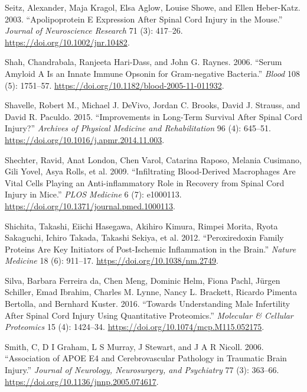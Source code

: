 \documentclass[9pt,lineno]{elife}
\newlength{\cslhangindent}
\newlength{\cslentryspacingunit} %
\newenvironment{CSLReferences}[2] %
 {%
  \setlength{\parindent}{0pt}
  \ifodd #1
  \let\oldpar\par
  \def\par{\hangindent=\cslhangindent\oldpar}
  \fi
  \setlength{\parskip}{#2\cslentryspacingunit}
 }%
 {}
\begin{document}
\begin{landscape}
\begin{landscape}
\begin{landscape}
\begin{landscape}
\begin{CSLReferences}{1}{0}
\leavevmode{}%
Seitz, Alexander, Maja Kragol, Elsa Aglow, Louise Showe, and Ellen Heber-Katz. 2003. {``Apolipoprotein {E} Expression After Spinal Cord Injury in the Mouse.''} \emph{Journal of Neuroscience Research} 71 (3): 417--26. \url{https://doi.org/10.1002/jnr.10482}.

\leavevmode{}%
Shah, Chandrabala, Ranjeeta Hari-Dass, and John G. Raynes. 2006. {``Serum Amyloid {A} Is an Innate Immune Opsonin for {Gram-negative} Bacteria.''} \emph{Blood} 108 (5): 1751--57. \url{https://doi.org/10.1182/blood-2005-11-011932}.

\leavevmode{}%
Shavelle, Robert M., Michael J. DeVivo, Jordan C. Brooks, David J. Strauss, and David R. Paculdo. 2015. {``Improvements in {Long-Term Survival After Spinal Cord Injury}?''} \emph{Archives of Physical Medicine and Rehabilitation} 96 (4): 645--51. \url{https://doi.org/10.1016/j.apmr.2014.11.003}.

\leavevmode{}%
Shechter, Ravid, Anat London, Chen Varol, Catarina Raposo, Melania Cusimano, Gili Yovel, Asya Rolls, et al. 2009. {``Infiltrating {Blood-Derived Macrophages Are Vital Cells Playing} an {Anti-inflammatory Role} in {Recovery} from {Spinal Cord Injury} in {Mice}.''} \emph{PLOS Medicine} 6 (7): e1000113. \url{https://doi.org/10.1371/journal.pmed.1000113}.

\leavevmode{}%
Shichita, Takashi, Eiichi Hasegawa, Akihiro Kimura, Rimpei Morita, Ryota Sakaguchi, Ichiro Takada, Takashi Sekiya, et al. 2012. {``Peroxiredoxin Family Proteins Are Key Initiators of Post-Ischemic Inflammation in the Brain.''} \emph{Nature Medicine} 18 (6): 911--17. \url{https://doi.org/10.1038/nm.2749}.

\leavevmode{}%
Silva, Barbara Ferreira da, Chen Meng, Dominic Helm, Fiona Pachl, Jürgen Schiller, Emad Ibrahim, Charles M. Lynne, Nancy L. Brackett, Ricardo Pimenta Bertolla, and Bernhard Kuster. 2016. {``Towards {Understanding Male Infertility After Spinal Cord Injury Using Quantitative Proteomics}.''} \emph{Molecular \& Cellular Proteomics} 15 (4): 1424--34. \url{https://doi.org/10.1074/mcp.M115.052175}.

\leavevmode{}%
Smith, C, D I Graham, L S Murray, J Stewart, and J A R Nicoll. 2006. {``Association of {APOE} E4 and Cerebrovascular Pathology in Traumatic Brain Injury.''} \emph{Journal of Neurology, Neurosurgery, and Psychiatry} 77 (3): 363--66. \url{https://doi.org/10.1136/jnnp.2005.074617}.


\end{CSLReferences}
\end{landscape}
\end{landscape}
\end{landscape}
\end{landscape}
\end{document}
